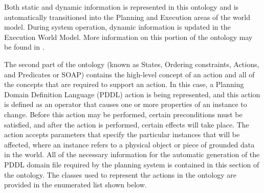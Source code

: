 Both static and dynamic information is represented in this
ontology and is automatically transitioned into the Planning and Execution areas of the world model. During system
operation,  dynamic information is updated in the Execution World Model.
More information on this portion of the ontology may be found in \cite{Balakirsky2012-1}.


The second part of the ontology (known as States, Ordering constraints, Actions, and Predicates or SOAP) contains the high-level concept of an action and all of the concepts 
that are required to support an action. In this case, a Planning Domain Definition Language (PDDL) \cite{PDDL} action is being represented, and this action is defined
 as an operator that causes one or more properties of an 
instance to change. Before this action may be
performed, certain preconditions must be satisfied, and after the action is performed, certain effects will take place. The action accepts parameters that specify the particular
instances that will be affected, where an instance refers to a physical object or piece of grounded data in the world. All of the necessary information for the automatic generation of the PDDL domain file required by the planning system is contained in this section of the ontology. The classes used to represent the actions in the ontology are provided in the
enumerated list shown below. 
